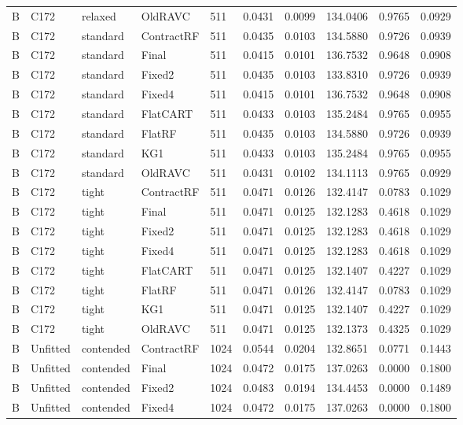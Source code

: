 \begin{longtable}{@{}llllllllll@{}}
B & C172 & relaxed & OldRAVC & 511 & 0.0431 & 0.0099 & 134.0406 & 0.9765 & 0.0929\\
B & C172 & standard & ContractRF & 511 & 0.0435 & 0.0103 & 134.5880 & 0.9726 & 0.0939\\
B & C172 & standard & Final & 511 & 0.0415 & 0.0101 & 136.7532 & 0.9648 & 0.0908\\
B & C172 & standard & Fixed2 & 511 & 0.0435 & 0.0103 & 133.8310 & 0.9726 & 0.0939\\
B & C172 & standard & Fixed4 & 511 & 0.0415 & 0.0101 & 136.7532 & 0.9648 & 0.0908\\
B & C172 & standard & FlatCART & 511 & 0.0433 & 0.0103 & 135.2484 & 0.9765 & 0.0955\\
B & C172 & standard & FlatRF & 511 & 0.0435 & 0.0103 & 134.5880 & 0.9726 & 0.0939\\
B & C172 & standard & KG1 & 511 & 0.0433 & 0.0103 & 135.2484 & 0.9765 & 0.0955\\
B & C172 & standard & OldRAVC & 511 & 0.0431 & 0.0102 & 134.1113 & 0.9765 & 0.0929\\
B & C172 & tight & ContractRF & 511 & 0.0471 & 0.0126 & 132.4147 & 0.0783 & 0.1029\\
B & C172 & tight & Final & 511 & 0.0471 & 0.0125 & 132.1283 & 0.4618 & 0.1029\\
B & C172 & tight & Fixed2 & 511 & 0.0471 & 0.0125 & 132.1283 & 0.4618 & 0.1029\\
B & C172 & tight & Fixed4 & 511 & 0.0471 & 0.0125 & 132.1283 & 0.4618 & 0.1029\\
B & C172 & tight & FlatCART & 511 & 0.0471 & 0.0125 & 132.1407 & 0.4227 & 0.1029\\
B & C172 & tight & FlatRF & 511 & 0.0471 & 0.0126 & 132.4147 & 0.0783 & 0.1029\\
B & C172 & tight & KG1 & 511 & 0.0471 & 0.0125 & 132.1407 & 0.4227 & 0.1029\\
B & C172 & tight & OldRAVC & 511 & 0.0471 & 0.0125 & 132.1373 & 0.4325 & 0.1029\\
B & Unfitted & contended & ContractRF & 1024 & 0.0544 & 0.0204 & 132.8651 & 0.0771 & 0.1443\\
B & Unfitted & contended & Final & 1024 & 0.0472 & 0.0175 & 137.0263 & 0.0000 & 0.1800\\
B & Unfitted & contended & Fixed2 & 1024 & 0.0483 & 0.0194 & 134.4453 & 0.0000 & 0.1489\\
B & Unfitted & contended & Fixed4 & 1024 & 0.0472 & 0.0175 & 137.0263 & 0.0000 & 0.1800\\

\end{longtable}
